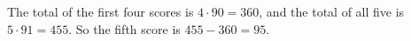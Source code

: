 The total of the first four scores is $4\cdot90=360$, and the total of all five is $5\cdot91=455$. So the fifth score is $455-360=\boxed{95}$.
